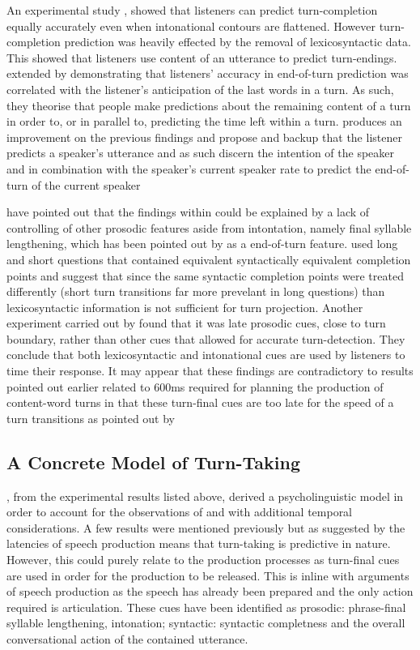 \documentclass[logo,bsc,singlespacing,parskip]{infthesis}
\begin{document}
An experimental study \cite{DeRuiter2006}, showed that listeners can predict turn-completion equally accurately even when intonational contours are flattened. However turn-completion prediction was heavily effected by the removal of lexicosyntactic data. This showed that listeners use content of an utterance to predict turn-endings. \cite{Magyari2012} extended \cite{DeRuiter2006} by demonstrating that listeners' accuracy in end-of-turn prediction was correlated with the listener's anticipation of the last words in a turn. As such, they theorise that people make predictions about the remaining content of a turn in order to, or in parallel to, predicting the time left within a turn. \cite{PicGar2013} produces an improvement on the previous findings and propose and backup that the listener predicts a speaker's utterance and as such discern the intention of the speaker and in combination with the speaker's current speaker rate to predict the end-of-turn of the current speaker

\cite{BogTor2015} have pointed out that the findings within \cite{DeRuiter2006} could be explained by a lack of controlling of other prosodic features aside from intontation, namely final syllable lengthening, which has been pointed out by \cite{Duncan1972} as a end-of-turn feature. \cite{BogTor2015} used long and short questions that contained equivalent syntactically equivalent completion points and suggest that since the same syntactic completion points were treated differently (short turn transitions far more prevelant in long questions) than lexicosyntactic information is not sufficient for turn projection. Another experiment carried out by \cite{BogTor2015} found that it was late prosodic cues, close to turn boundary, rather than other cues that allowed for accurate turn-detection. They conclude that both lexicosyntactic and intonational cues are used by listeners to time their response. It may appear that these findings are contradictory to results pointed out earlier related to 600ms required for planning the production of content-word turns \cite{IndLev2004} in that these turn-final cues are too late for the speed of a turn transitions as pointed out by \cite{Sacks1974}

\subsection{A Concrete Model of Turn-Taking}
\cite{LevTor2015}, from the experimental results listed above, derived a psycholinguistic model in order to account for the observations of \cite{Sacks1974} and with additional temporal considerations. A few results were mentioned previously but as suggested by \cite{Sacks1974} the latencies of speech production means that turn-taking is predictive in nature. However, this could purely relate to the production processes as turn-final cues are used in order for the production to be released. This is inline with arguments of speech production as the speech has already been prepared and the only action required is articulation. These cues have been identified as prosodic: phrase-final syllable lengthening, intonation; syntactic: syntactic completness and the overall conversational action of the contained utterance. 
\end{document}
